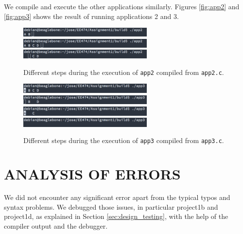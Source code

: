 \documentclass[letterpaper, 12pt]{article}
\begin{document}
We compile and execute the other applications similarly. Figures \ref{fig:app2} and \ref{fig:app3} shows the result of running applications 2 and 3.

\begin{figure}[!ht]
  \centering
  \captionsetup{width=0.8\textwidth}
  \includegraphics[width=0.6\textwidth]{images/app2_1.png}
  \includegraphics[width=0.6\textwidth]{images/app2_2.png}
  \includegraphics[width=0.6\textwidth]{images/app2_3.png}
  \cprotect\caption{Different steps during the execution of \verb+app2+ compiled from \verb+app2.c+.}
\end{figure}

\begin{figure}[!ht]
  \centering
  \captionsetup{width=0.8\textwidth}
  \includegraphics[width=0.6\textwidth]{images/app3_1.png}
  \includegraphics[width=0.6\textwidth]{images/app3_2.png}
  \includegraphics[width=0.6\textwidth]{images/app3_3.png}
  \includegraphics[width=0.6\textwidth]{images/app3_4.png}
  \cprotect\caption{Different steps during the execution of \verb+app3+ compiled from \verb+app3.c+.}
\end{figure}

\section{ANALYSIS OF ERRORS}
\label{sec:errors}

We did not encounter any significant error apart from the typical typos and syntax problems. We debugged those issues, in particular project1b and project1d, as explained in Section \ref{sec:design_testing}, with the help of the compiler output and the debugger.
\end{document}
